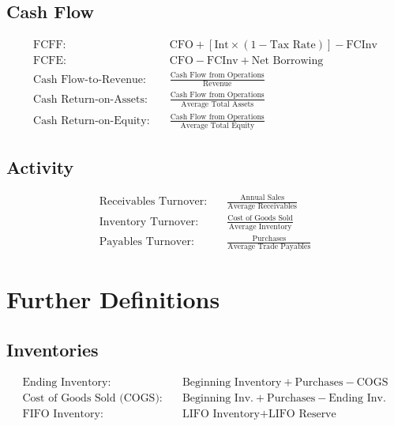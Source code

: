 \documentclass[12pt]{article}
\begin{document}
\subsection{Cash Flow}
\begin{tcolorbox}
\begin{align*}
	\text{FCFF:} \quad & \text{CFO} + [\text{Int} \times (1 - \text{Tax Rate})] - \text{FCInv} \\
	\text{FCFE:} \quad & \text{CFO} - \text{FCInv} + \text{Net Borrowing} \\
	\text{Cash Flow-to-Revenue:} \quad & \frac{\text{Cash Flow from Operations}}{\text{Revenue}} \\
	\text{Cash Return-on-Assets:} \quad & \frac{\text{Cash Flow from Operations}}{\text{Average Total Assets}} \\
	\text{Cash Return-on-Equity:} \quad & \frac{\text{Cash Flow from Operations}}{\text{Average Total Equity}}
\end{align*}
\end{tcolorbox}
\subsection{Activity}
\begin{tcolorbox}
\begin{align*}
	\text{Receivables Turnover:} \quad & \frac{\text{Annual Sales}}{\text{Average Receivables}} \\
	\text{Inventory Turnover:} \quad & \frac{\text{Cost of Goods Sold}}{\text{Average Inventory}} \\
	\text{Payables Turnover:} \quad & \frac{\text{Purchases}}{\text{Average Trade Payables}}
\end{align*}
\end{tcolorbox}

\section{Further Definitions}
\subsection{Inventories}
\begin{tcolorbox}	
	\begin{align*}
		\text{Ending Inventory:} \quad & \text{Beginning Inventory} + \text{Purchases} - \text{COGS} \\
		\text{Cost of Goods Sold (COGS):} \quad & \text{Beginning Inv.} + \text{Purchases} - \text{Ending Inv.} \\
		\text{FIFO Inventory:} \quad & \text{LIFO Inventory} + \text{LIFO Reserve} 
	\end{align*}
\end{tcolorbox}	
\end{document}

